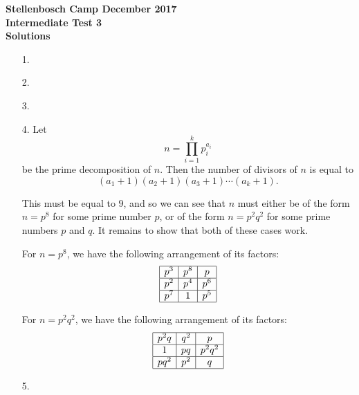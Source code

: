 \documentclass[a4paper,12pt]{article}
\begin{document}
\begin{center}
\textbf{Stellenbosch Camp December 2017 \\ Intermediate Test 3} \\
\textbf{Solutions}
\end{center}


\begin{enumerate}
    
    \item[1.] 
    
    
    \item[2.] 
    
    
    \item[3.] 
    
    
    \item[4.] Let
    \[
        n = \prod_{i=1}^{k} p_i^{a_i}
    \]
    be the prime decomposition of $n$. Then the number of divisors of $n$ is
    equal to
    \[
        (a_1 + 1)(a_2 + 1)(a_3 + 1) \cdots (a_k + 1).
    \]

    This must be equal to $9$, and so we can see that $n$ must either be of the
    form $n = p^8$ for some prime number $p$, or of the form $n = p^2 q^2$ for
    some prime numbers $p$ and $q$. It remains to show that both of these cases
    work.

    For $n = p^8$, we have the following arrangement of its factors:
    \[
        \begin{array}{|c|c|c|}
            \hline
            p^3 & p^8 & p \\
            \hline
            p^2 & p^4 & p^6 \\
            \hline
            p^7 & 1 & p^5 \\
            \hline
        \end{array}
    \]

    For $n = p^2 q^2$, we have the following arrangement of its factors:
    \[
        \begin{array}{|c|c|c|}
            \hline
            p^2 q & q^2 & p \\
            \hline
            1 & p q & p^2 q^2 \\
            \hline
            pq^2 & p^2 & q \\
            \hline
        \end{array}
    \]

    \item[5.]  %
    

\end{enumerate}
\end{document}
